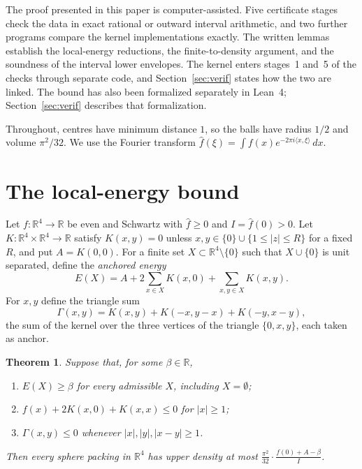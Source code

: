 \documentclass[11pt]{amsart}
\numberwithin{equation}{section}
\newtheorem{theorem}{Theorem}[section]
\theoremstyle{remark}
\newcommand{\R}{\mathbb{R}}
\newcommand{\ip}[2]{\langle #1,#2\rangle}
\newcommand{\Gam}{\Gamma}
\begin{document}
The proof presented in this paper is computer-assisted. Five certificate stages check the data in exact rational or outward interval arithmetic, and two further programs compare the kernel implementations exactly. The written lemmas establish the local-energy reductions, the finite-to-density argument, and the soundness of the interval lower envelopes. The kernel enters stages~1 and~5 of the checks through separate code, and Section~\ref{sec:verif} states how the two are linked. The bound has also been formalized separately in Lean~4; Section~\ref{sec:verif} describes that formalization.

Throughout, centres have minimum distance $1$, so the balls have radius $1/2$ and volume $\pi^2/32$. We use the Fourier transform $\hat f(\xi)=\int f(x)e^{-2\pi i\ip x\xi}\,dx$.

\section{The local-energy bound}\label{sec:local}

Let $f\colon\R^4\to\R$ be even and Schwartz with $\hat f\ge0$ and $I=\hat f(0)>0$. Let $K\colon\R^4\times\R^4\to\R$ satisfy $K(x,y)=0$ unless $x,y\in\{0\}\cup\{1\le|z|\le R\}$ for a fixed $R$, and put $A=K(0,0)$. For a finite set $X\subset\R^4\setminus\{0\}$ such that $X\cup\{0\}$ is unit separated, define the \emph{anchored energy}
\[
E(X)=A+2\sum_{x\in X}K(x,0)+\sum_{x,y\in X}K(x,y).
\]
For $x,y$ define the triangle sum
\[
\Gam(x,y)=K(x,y)+K(-x,y-x)+K(-y,x-y),
\]
the sum of the kernel over the three vertices of the triangle $\{0,x,y\}$, each taken as anchor.

\begin{theorem}\label{thm:local}
Suppose that, for some $\beta\in\R$,
\begin{enumerate}
\item $E(X)\ge\beta$ for every admissible $X$, including $X=\emptyset$;
\item $f(x)+2K(x,0)+K(x,x)\le0$ for $|x|\ge1$;
\item $\Gam(x,y)\le0$ whenever $|x|,|y|,|x-y|\ge1$.
\end{enumerate}
Then every sphere packing in $\R^4$ has upper density at most $\frac{\pi^2}{32}\cdot\frac{f(0)+A-\beta}{I}$.
\end{theorem}
\end{document}
